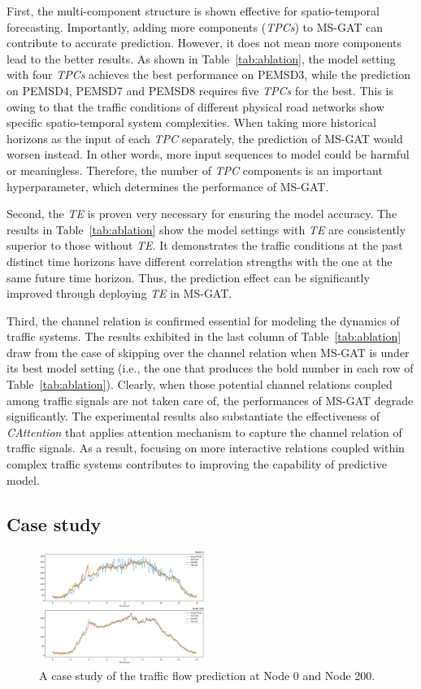 First, the multi-component structure is shown effective for spatio-temporal forecasting. Importantly, adding more components (\textit{TPCs})  to MS-GAT can contribute to accurate prediction. However, it does not mean  more components lead to the better results. As shown in Table~\ref{tab:ablation}, the model setting with four \textit{TPCs} achieves the best performance on PEMSD3, while the prediction on PEMSD4, PEMSD7 and PEMSD8 requires five \textit{TPCs} for the best. This is owing to that the traffic conditions of different physical road networks show specific spatio-temporal system complexities. When taking more historical horizons as the input of each \textit{TPC} separately, the prediction of MS-GAT would worsen instead. In other words, more input sequences to model could be harmful or meaningless. Therefore, the number of \textit{TPC} components is an important hyperparameter, which determines the performance of MS-GAT.

Second, the \textit{TE} is proven very necessary for ensuring the model accuracy. The  results in Table~\ref{tab:ablation} show the model settings with \textit{TE} are consistently superior to those without \textit{TE}. It demonstrates the traffic conditions at the past distinct time horizons have different correlation strengths with the one at the same future time horizon. Thus, the prediction effect can be significantly improved through deploying \textit{TE} in MS-GAT.

Third, the channel relation is confirmed essential for modeling the dynamics of traffic systems. The results exhibited in the last column of Table~\ref{tab:ablation} draw from the case of skipping over the channel relation when MS-GAT is under its best model setting (i.e., the one that produces the bold number in each row of Table~\ref{tab:ablation}). Clearly, when those potential channel relations coupled among traffic signals are not taken care of, the performances of MS-GAT degrade significantly. The experimental results also substantiate the effectiveness of \textit{CAttention} that applies attention mechanism to capture the channel relation of traffic signals. As a result, focusing on more interactive relations coupled within complex traffic systems contributes to improving the capability of predictive model.

\subsection{Case study}

\begin{figure}[!ht]
    \centering
    \includegraphics[width=0.48\textwidth]{pictures/Case_1.png}
    \caption{A case study of the traffic flow prediction at Node 0 and Node 200.}
    \label{fig:case_1}
\end{figure}

